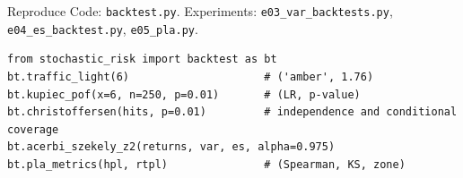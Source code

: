 \documentclass[aspectratio=169,10pt]{beamer}
\begin{document}
\begin{frame}[fragile]{Reproduce}
  \small
  Code: \texttt{backtest.py}. Experiments: \texttt{e03\_var\_backtests.py}, \texttt{e04\_es\_backtest.py}, \texttt{e05\_pla.py}.
\begin{verbatim}
from stochastic_risk import backtest as bt
bt.traffic_light(6)                     # ('amber', 1.76)
bt.kupiec_pof(x=6, n=250, p=0.01)       # (LR, p-value)
bt.christoffersen(hits, p=0.01)         # independence and conditional coverage
bt.acerbi_szekely_z2(returns, var, es, alpha=0.975)
bt.pla_metrics(hpl, rtpl)               # (Spearman, KS, zone)
\end{verbatim}
\end{frame}

\deckreferences
\end{document}
